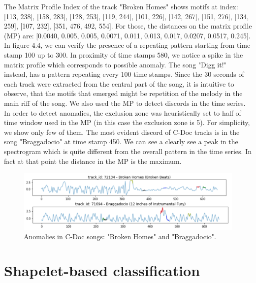 The Matrix Profile Index of the track "Broken Homes" shows motifs at index: [113, 238], [158, 283], [128, 253], [119, 244], [101, 226], [142, 267], [151, 276], [134, 259], [107, 232], [351, 476, 492, 554]. For those, the distances on the matrix profile (MP) are: [0.0040, 0.005, 0.005, 0.0071, 0.011, 0.013, 0.017, 0.0207, 0.0517, 0.245]. In figure 4.4, we can verify the presence of a repeating pattern starting from time stamp 100 up to 300.
In proximity of time stamps 580, we notice a spike in the matrix profile which corresponds to possible anomaly.
The song "Digg it!" instead, has a pattern repeating every 100 time stamps. Since the 30 seconds of each track were extracted from the central part of the song, it is intuitive to observe, that the motifs that emerged might be repetition of the melody in the main riff of the song. We also used the MP to detect discords in the time series. In order to detect anomalies, the exclusion zone was heuristically set to half of time window used in the MP (in this case the exclusion zone is 5). 
For simplicity, we show only few of them. The most evident discord of C-Doc tracks is in the song "Braggadocio" at time stamp 450. We can see a clearly see a peak in the spectrogram which is quite different from the overall pattern in the time series. In fact at that point the distance in the MP is the maximum.  
\begin{figure}[!htb]
  \centering
  \includegraphics[width=0.8\linewidth]{images/CDOC - Anomalies.png}
  \caption{Anomalies in C-Doc songs: "Broken Homes" and "Braggadocio".}
\end{figure}

\section{Shapelet-based classification}

